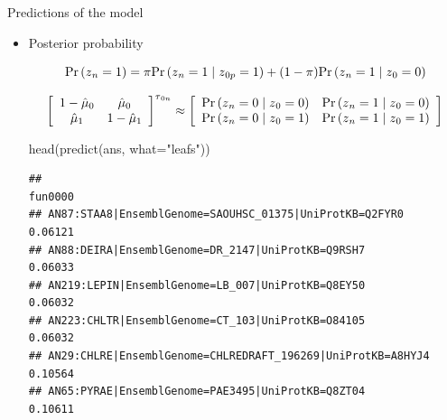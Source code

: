 \documentclass[9pt,handout,ignorenonframetext,]{beamer}
\newenvironment{Shaded}{\begin{snugshade}}{\end{snugshade}}
\newcommand{\KeywordTok}[1]{\textcolor[rgb]{0.94,0.87,0.69}{#1}}
\newcommand{\DataTypeTok}[1]{\textcolor[rgb]{0.87,0.87,0.75}{#1}}
\newcommand{\StringTok}[1]{\textcolor[rgb]{0.80,0.58,0.58}{#1}}
\newcommand{\NormalTok}[1]{\textcolor[rgb]{0.80,0.80,0.80}{#1}}
\renewcommand{\Pr}[1]{{\mbox{Pr}\left(#1\right) }}
\newcommand{\Prcond}[2]{{\mbox{Pr}\left(#1\vphantom{#2}\;\right|\left.\vphantom{#1}#2\right)}}
\newcommand{\ann}{z{}} %
\newcommand{\geodesic}{\tau{}}
\begin{document}
\begin{frame}[fragile,t]{Predictions of the model}

\begin{itemize}
\item
  Posterior probability\pause

  \[
  \Pr{\ann_{n} = 1} = %
  \pi \Prcond{\ann_{n} = 1}{\ann_{0p} = 1} + 
  (1 - \pi) \Prcond{\ann_{n} = 1}{\ann_{0} = 0}
  \]

  \pause

  \[
  \left[\begin{array}{cc}
  1 - \hat\mu_0 &  \hat\mu_0 \\
  \hat\mu_1 &  1 - \hat\mu_1
  \end{array}
  \right]^{\geodesic_{0n}}
  \approx 
  \left[\begin{array}{cc}
  \Prcond{\ann_n = 0}{\ann_0 = 0} & \Prcond{\ann_n = 1}{\ann_0 = 0} \\
  \Prcond{\ann_n = 0}{\ann_0 = 1} & \Prcond{\ann_n = 1}{\ann_0 = 1}
  \end{array}
  \right]
  \]

  \pause

  \footnotesize

\begin{Shaded}
\begin{Highlighting}[]
\KeywordTok{head}\NormalTok{(}\KeywordTok{predict}\NormalTok{(ans, }\DataTypeTok{what=}\StringTok{"leafs"}\NormalTok{))}
\end{Highlighting}
\end{Shaded}

\begin{verbatim}
##                                                             fun0000
## AN87:STAA8|EnsemblGenome=SAOUHSC_01375|UniProtKB=Q2FYR0     0.06121
## AN88:DEIRA|EnsemblGenome=DR_2147|UniProtKB=Q9RSH7           0.06033
## AN219:LEPIN|EnsemblGenome=LB_007|UniProtKB=Q8EY50           0.06032
## AN223:CHLTR|EnsemblGenome=CT_103|UniProtKB=O84105           0.06032
## AN29:CHLRE|EnsemblGenome=CHLREDRAFT_196269|UniProtKB=A8HYJ4 0.10564
## AN65:PYRAE|EnsemblGenome=PAE3495|UniProtKB=Q8ZT04           0.10611
\end{verbatim}

  \normalsize
\end{itemize}

\end{frame}
\end{document}
